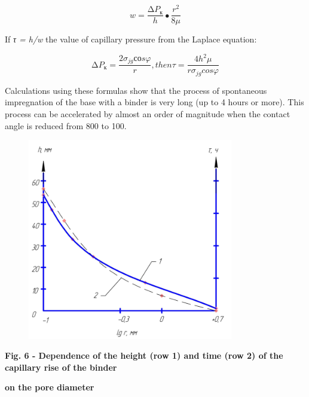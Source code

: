 \[w = \frac{\mathrm{\Delta}P_{к}}{h} \bullet \frac{r^{2}}{8\mu}\]

If \emph{τ = h/w} the value of capillary pressure from the Laplace
equation:

\[\mathrm{\Delta}P_{к} = \frac{2\sigma_{jg}соs\varphi}{r},then\tau = \frac{4h^{2}\mu}{r\sigma_{jg}cos\varphi}\]

Calculations using these formulas show that the process of spontaneous
impregnation of the base with a binder is very long (up to 4 hours or
more). This process can be accelerated by almost an order of magnitude
when the contact angle is reduced from 800 to 100.

\begin{figure}[H]
	\centering
	\includegraphics[width=0.8\textwidth]{media/gorn2/image9}
	\caption*{}
\end{figure}


{\bfseries Fig. 6 - Dependence of the height (row 1) and time (row 2) of
the capillary rise of the binder}

{\bfseries on the pore diameter}

